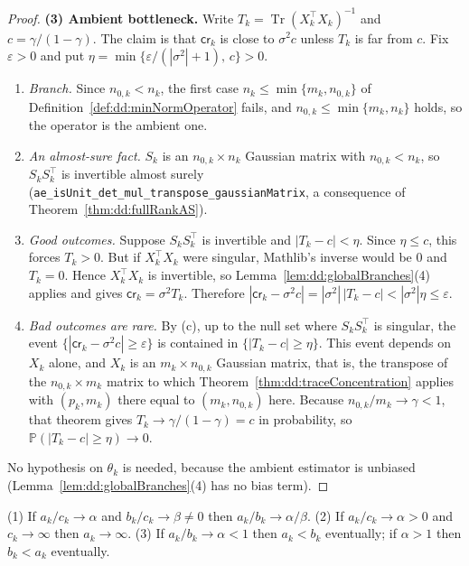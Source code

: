 \begin{proof}
\medskip\noindent\textbf{(3) Ambient bottleneck.} Write $T_k=\operatorname{Tr}(X_k^\top X_k)^{-1}$ and $c=\gamma/(1-\gamma)$. The claim is that $\mathsf{cr}_k$ is close to $\sigma^2c$ unless $T_k$ is far from $c$. Fix $\varepsilon>0$ and put $\eta=\min\{\varepsilon/(|\sigma^2|+1),\,c\}>0$.
\begin{enumerate}
  \item[(a)] \emph{Branch.} Since $n_{0,k}<n_k$, the first case $n_k\le\min\{m_k,n_{0,k}\}$ of Definition~\ref{def:dd:minNormOperator} fails, and $n_{0,k}\le\min\{m_k,n_k\}$ holds, so the operator is the ambient one.
  \item[(b)] \emph{An almost-sure fact.} $S_k$ is an $n_{0,k}\times n_k$ Gaussian matrix with $n_{0,k}<n_k$, so $S_kS_k^\top$ is invertible almost surely (\texttt{ae\_isUnit\_det\_mul\_transpose\_gaussianMatrix}, a consequence of Theorem~\ref{thm:dd:fullRankAS}).
  \item[(c)] \emph{Good outcomes.} Suppose $S_kS_k^\top$ is invertible and $|T_k-c|<\eta$. Since $\eta\le c$, this forces $T_k>0$. But if $X_k^\top X_k$ were singular, Mathlib's inverse would be $0$ and $T_k=0$. Hence $X_k^\top X_k$ is invertible, so Lemma~\ref{lem:dd:globalBranches}(4) applies and gives
  $\mathsf{cr}_k=\sigma^2T_k$. Therefore $|\mathsf{cr}_k-\sigma^2c|=|\sigma^2|\,|T_k-c|<|\sigma^2|\eta\le\varepsilon$.
  \item[(d)] \emph{Bad outcomes are rare.} By (c), up to the null set where $S_kS_k^\top$ is singular, the event $\{|\mathsf{cr}_k-\sigma^2c|\ge\varepsilon\}$ is contained in $\{|T_k-c|\ge\eta\}$. This event depends on $X_k$ alone, and $X_k$ is an $m_k\times n_{0,k}$ Gaussian matrix, that is, the transpose of the $n_{0,k}\times m_k$ matrix to which Theorem~\ref{thm:dd:traceConcentration} applies with $(p_k,m_k)$ there equal to $(m_k,n_{0,k})$ here. Because $n_{0,k}/m_k\to\gamma<1$, that theorem gives $T_k\to\gamma/(1-\gamma)=c$ in probability, so $\mathbb P(|T_k-c|\ge\eta)\to0$.
\end{enumerate}
No hypothesis on $\theta_k$ is needed, because the ambient estimator is unbiased (Lemma~\ref{lem:dd:globalBranches}(4) has no bias term).
\end{proof}

\begin{lemma}\label{lem:dd:globalRatios}
  \leanok
(1) If $a_k/c_k\to\alpha$ and $b_k/c_k\to\beta\ne0$ then $a_k/b_k\to\alpha/\beta$. (2) If $a_k/c_k\to\alpha>0$ and $c_k\to\infty$ then $a_k\to\infty$. (3) If $a_k/b_k\to\alpha<1$ then $a_k<b_k$ eventually; if $\alpha>1$ then $b_k<a_k$ eventually.
\end{lemma}

